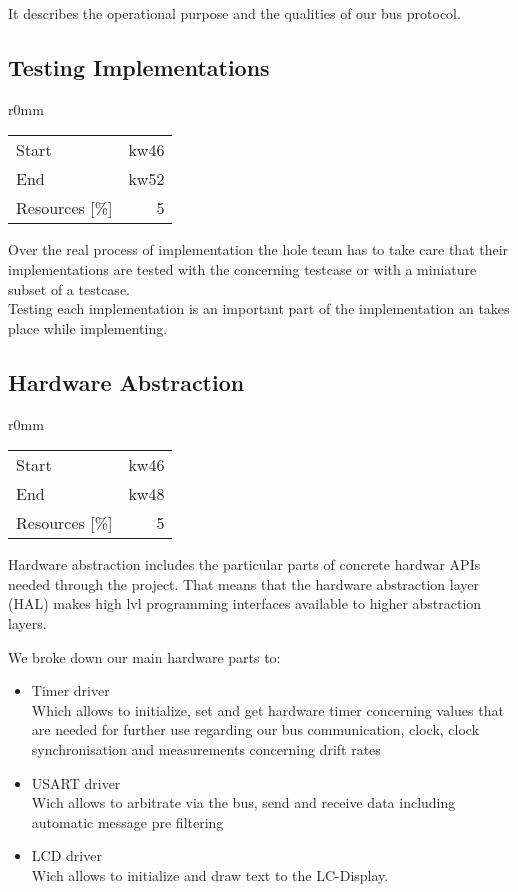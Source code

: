 It describes the operational purpose and the qualities of our bus protocol.
\subsection{Testing Implementations}
\begin{wrapfigure}{r}{0mm}
\begin{tabular}[t]{|lr|}
\hline
Start & kw46\\
End & kw52\\
Resources [\%] & 5\\
\hline
\end{tabular}
\end{wrapfigure}
Over the real process of implementation the hole team has to take care that their 
implementations are tested with the concerning testcase or with a miniature subset of a testcase.\\

Testing each implementation is an important part of the implementation an takes place while
implementing.
\subsection{Hardware Abstraction}
\begin{wrapfigure}{r}{0mm}
\begin{tabular}[t]{|lr|}
\hline
Start & kw46\\
End & kw48\\
Resources [\%] & 5\\
\hline
\end{tabular}
\end{wrapfigure}
Hardware abstraction includes the particular parts of concrete hardwar APIs needed through the project. 
That means that the hardware abstraction layer (HAL) makes high lvl programming interfaces available to 
higher abstraction layers.

We broke down our main hardware parts to:
\begin{itemize}
 \item Timer driver\\
Which allows to initialize, set and get hardware timer concerning values that are needed
for further use regarding our bus communication, clock, clock synchronisation and 
measurements concerning drift rates
 \item USART driver\\
Wich allows to arbitrate via the bus, send and receive data including automatic message 
pre filtering
 \item LCD driver\\
Wich allows to initialize and draw text to the LC-Display.
\end{itemize}

